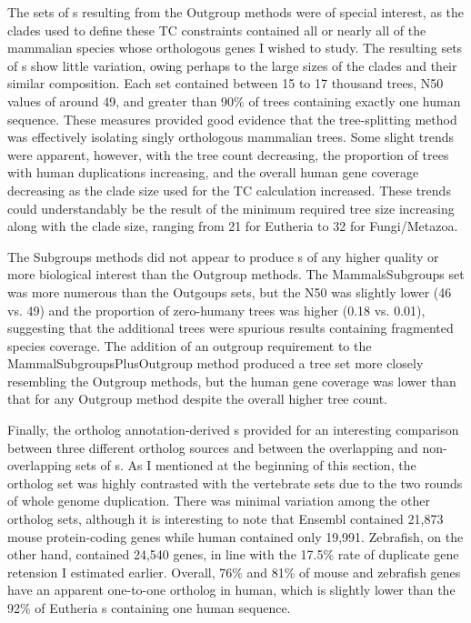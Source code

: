 The sets of \subtr{}s resulting from the Outgroup methods were of
special interest, as the clades used to define these TC constraints
contained all or nearly all of the mammalian species whose orthologous
genes I wished to study. The resulting sets of \subtr{}s show little
variation, owing perhaps to the large sizes of the clades and their
similar composition. Each set contained between 15 to 17 thousand
trees, N50 values of around 49, and greater than 90\% of trees
containing exactly one human sequence. These measures provided good
evidence that the tree-splitting method was effectively isolating
singly orthologous mammalian trees.  Some slight trends were apparent,
however, with the tree count decreasing, the proportion of trees with
human duplications increasing, and the overall human gene coverage
decreasing as the clade size used for the TC calculation
increased. These trends could understandably be the result of the
minimum required tree size increasing along with the clade size,
ranging from 21 for Eutheria to 32 for Fungi/Metazoa.

The Subgroups methods did not appear to produce \subtr{}s of any
higher quality or more biological interest than the Outgroup
methods. The MammalsSubgroups set was more numerous than the Outgoups
sets, but the N50 was slightly lower (46 vs. 49) and the proportion of
zero-humany trees was higher (0.18 vs. 0.01), suggesting that the
additional trees were spurious results containing fragmented species
coverage. The addition of an outgroup requirement to the
MammalSubgroupsPlusOutgroup method produced a tree set more closely
resembling the Outgroup methods, but the human gene coverage was
lower than that for any Outgroup method despite the overall higher
tree count.

Finally, the ortholog annotation-derived \subtr{}s provided for an
interesting comparison between three different ortholog sources and
between the overlapping and non-overlapping sets of \subtr{}s. As I
mentioned at the beginning of this section, the 
ortholog set was highly contrasted with the vertebrate sets due to the
two rounds of whole genome duplication. There was minimal variation
among the other ortholog sets, although it is interesting to note that
Ensembl contained 21,873 mouse protein-coding genes while human
contained only 19,991. Zebrafish, on the other hand, contained 24,540
genes, in line with the 17.5\% rate of duplicate gene retension I
estimated earlier. Overall, 76\% and 81\% of mouse and zebrafish genes
have an apparent one-to-one ortholog in human, which is slightly lower
than the 92\% of Eutheria \subtr{}s containing one human sequence.

